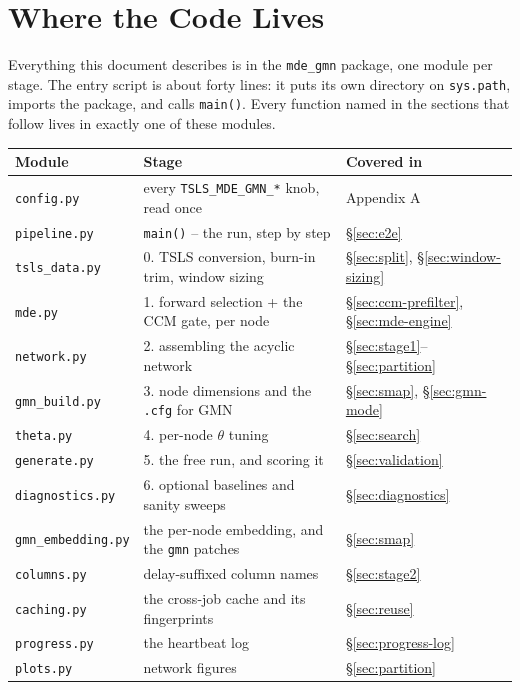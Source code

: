 \documentclass[11pt]{article}
\begin{document}
\newpage
\section{Where the Code Lives}
\label{sec:architecture}

Everything this document describes is in the \texttt{mde\_gmn} package, one module per stage. The entry script is about forty lines: it puts its own directory on \texttt{sys.path}, imports the package, and calls \texttt{main()}. Every function named in the sections that follow lives in exactly one of these modules.

\begin{center}
\small
\begin{tabular}{@{}lll@{}}
\toprule
\textbf{Module} & \textbf{Stage} & \textbf{Covered in} \\
\midrule
\texttt{config.py}         & every \texttt{TSLS\_MDE\_GMN\_*} knob, read once & Appendix A \\
\texttt{pipeline.py}       & \texttt{main()} -- the run, step by step          & \S\ref{sec:e2e} \\
\texttt{tsls\_data.py}     & 0. TSLS conversion, burn-in trim, window sizing   & \S\ref{sec:split}, \S\ref{sec:window-sizing} \\
\texttt{mde.py}            & 1. forward selection + the CCM gate, per node     & \S\ref{sec:ccm-prefilter}, \S\ref{sec:mde-engine} \\
\texttt{network.py}        & 2. assembling the acyclic network                 & \S\ref{sec:stage1}--\S\ref{sec:partition} \\
\texttt{gmn\_build.py}     & 3. node dimensions and the \texttt{.cfg} for GMN  & \S\ref{sec:smap}, \S\ref{sec:gmn-mode} \\
\texttt{theta.py}          & 4. per-node $\theta$ tuning                       & \S\ref{sec:search} \\
\texttt{generate.py}       & 5. the free run, and scoring it                   & \S\ref{sec:validation} \\
\texttt{diagnostics.py}    & 6. optional baselines and sanity sweeps           & \S\ref{sec:diagnostics} \\
\texttt{gmn\_embedding.py} & the per-node embedding, and the \texttt{gmn} patches & \S\ref{sec:smap} \\
\texttt{columns.py}        & delay-suffixed column names                       & \S\ref{sec:stage2} \\
\texttt{caching.py}        & the cross-job cache and its fingerprints          & \S\ref{sec:reuse} \\
\texttt{progress.py}       & the heartbeat log                                 & \S\ref{sec:progress-log} \\
\texttt{plots.py}          & network figures                                   & \S\ref{sec:partition} \\
\bottomrule
\end{tabular}
\end{center}
\end{document}
